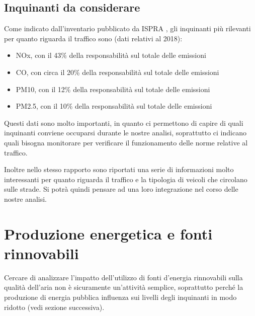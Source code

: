 \documentclass{article}
\begin{document}
\subsection{Inquinanti da considerare}
Come indicato dall'inventario pubblicato da ISPRA \cite{iir2020}, gli inquinanti più rilevanti per quanto riguarda il traffico sono (dati relativi al 2018): 
\begin{itemize}
	\item NOx, con il 43\% della responsabilità sul totale delle emissioni
	\item CO, con circa il 20\% della responsabilità sul totale delle emissioni
	\item PM10, con il 12\% della responsabilità sul totale delle emissioni
	\item PM2.5, con il 10\% della responsabilità sul totale delle emissioni
\end{itemize}
Questi dati sono molto importanti, in quanto ci permettono di capire di quali inquinanti conviene occuparsi durante le nostre analisi, soprattutto ci indicano quali bisogna monitorare per verificare il funzionamento delle norme relative al traffico. 

Inoltre nello stesso rapporto sono riportati una serie di informazioni molto interessanti per quanto riguarda il traffico e la tipologia di veicoli che circolano sulle strade. Si potrà quindi pensare ad una loro integrazione nel corso delle nostre analisi.


\section{Produzione energetica e fonti rinnovabili}
\label{sec:energia}
Cercare di analizzare l'impatto dell'utilizzo di fonti d'energia rinnovabili sulla qualità dell'aria non è sicuramente un'attività semplice, soprattutto perché la produzione di energia pubblica influenza sui livelli degli inquinanti in modo ridotto (vedi sezione successiva).
\end{document}
